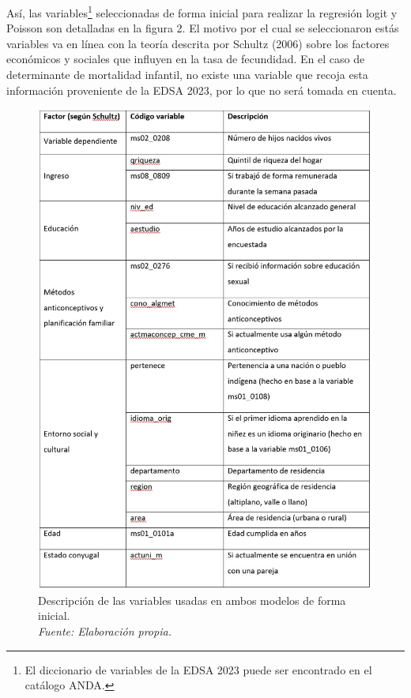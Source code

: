 \documentclass[Royal,times,sageh]{sagej}
\begin{document}
Así, las variables\footnote{El diccionario de variables de la EDSA 2023
  puede ser encontrado en el catálogo ANDA.} seleccionadas de forma
inicial para realizar la regresión logit y Poisson son detalladas en la
figura 2. El motivo por el cual se seleccionaron estás variables va en
línea con la teoría descrita por Schultz (2006) sobre los factores
económicos y sociales que influyen en la tasa de fecundidad. En el caso
de determinante de mortalidad infantil, no existe una variable que
recoja esta información proveniente de la EDSA 2023, por lo que no será
tomada en cuenta.

\begin{figure}

{\centering \includegraphics[width=0.9\linewidth]{imagenes/foto2} 

}

\caption{Descripción de las variables usadas en ambos modelos de forma inicial.\\\textit{Fuente: Elaboración propia.}}\label{fig:unnamed-chunk-2}
\end{figure}
\end{document}
